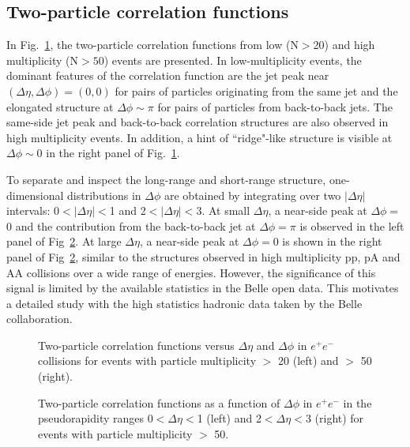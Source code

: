 \subsection{Two-particle correlation functions}

In Fig.~\ref{fig:ridgeBelle}, the two-particle correlation functions from low (N$>$20) and high multiplicity (N$>50$) events are presented. In low-multiplicity events, the dominant features of the correlation function are the jet peak near $(\Delta\eta,\Delta\phi)=(0,0)$ for pairs of particles originating from the same jet and the elongated structure at $\Delta\phi\sim\pi$ for pairs of particles from back-to-back jets. %
The same-side jet peak and back-to-back correlation structures are also observed in high multiplicity events. 
In addition, a hint of ``ridge"-like structure is visible at $\Delta\phi \sim$0 in the right panel of Fig.~\ref{fig:ridgeBelle}. 

To separate and inspect the long-range and short-range structure, one-dimensional distributions in $\Delta\phi$ are obtained by integrating over two $|\Delta\eta|$ intervals: 0$<|\Delta \eta|<$1 and 
2$<|\Delta \eta|<$3.  At small $\Delta\eta$, a near-side peak at $\Delta\phi=$0 and the contribution from the back-to-back jet at $\Delta\phi=\pi$ is observed in the left panel of Fig~\ref{fig:ProjectionMult50}. At large $\Delta\eta$, a near-side peak at $\Delta\phi=0$ is shown in the right panel of Fig~\ref{fig:ProjectionMult50}, similar to the structures observed in high multiplicity pp, pA and AA collisions over a wide range of energies. However, the significance of this signal is limited by the available statistics in the Belle open data. This motivates a detailed study with the high statistics hadronic data taken by the Belle collaboration. 

\begin{figure}[!htb]
\begin{center}
\caption{Two-particle correlation functions versus $\Delta\eta$ and $\Delta\phi$ in $e^{+}e^{-}$ collisions for events with particle multiplicity $>$ 20 (left) and  $>$ 50 (right).}
\label{fig:ridgeBelle} 
\end{center}
\end{figure}

\begin{figure}[!htb]
\begin{center}
\caption{Two-particle correlation functions as a function of  $\Delta\phi$ in $e^{+}e^{-}$ in the pseudorapidity ranges 0$<\Delta \eta<$1 (left) and 2$<\Delta \eta<$3 (right) for events with particle multiplicity $>$ 50.}
\label{fig:ProjectionMult50} 
\end{center}
\end{figure}

